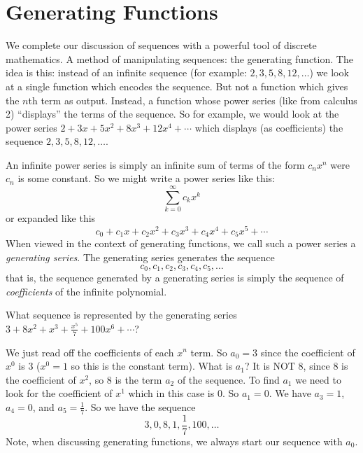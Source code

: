 \documentclass[12pt]{article}
\begin{document}
\section{Generating Functions}

We complete our discussion of sequences with a powerful tool of discrete mathematics.  A method of manipulating sequences: the generating function. The idea is this: instead of an infinite sequence (for example: $2, 3, 5, 8, 12, \ldots$) we look at a single function which encodes the sequence.  But not a function which gives the $n$th term as output.  Instead, a function whose power series (like from calculus 2) ``displays'' the terms of the sequence.  So for example, we would look at the power series $2 + 3x + 5x^2 + 8x^3 + 12x^4 + \cdots$ which displays (as coefficients) the sequence $2, 3, 5, 8, 12, \ldots$.

An infinite power series is simply an infinite sum of terms of the form $c_nx^n$ were $c_n$ is some constant.  So we might write a power series like this:
\[\sum_{k=0}^\infty c_k x^k\]
or expanded like this
\[c_0 + c_1x + c_2x^2 + c_3x^3 + c_4x^4 + c_5x^5 + \cdots\]
When viewed in the context of generating functions, we call such a power series a {\em generating series}.  The generating series generates the sequence
\[c_0, c_1, c_2, c_3, c_4, c_5, \ldots\]
that is, the sequence generated by a generating series is simply the sequence of {\em coefficients} of the infinite polynomial.  

\begin{example}
 What sequence is represented by the generating series $3 + 8x^2 + x^3 + \frac{x^5}{7} + 100x^6 + \cdots$?
 \begin{solution}
  We just read off the coefficients of each $x^n$ term.  So $a_0 = 3$ since the coefficient of $x^0$ is 3 ($x^0 = 1$ so this is the constant term).  What is $a_1$?  It is NOT 8, since 8 is the coefficient of $x^2$, so 8 is the term $a_2$ of the sequence.  To find $a_1$ we need to look for the coefficient of $x^1$ which in this case is 0.  So $a_1 = 0$.  We have $a_3 = 1$, $a_4 = 0$, and $a_5 = \frac{1}{7}$.  So we have the sequence
  \[3, 0, 8, 1, \frac{1}{7}, 100, \ldots\]
  Note, when discussing generating functions, we always start our sequence with $a_0$.
 \end{solution}

\end{example}
\end{document}
